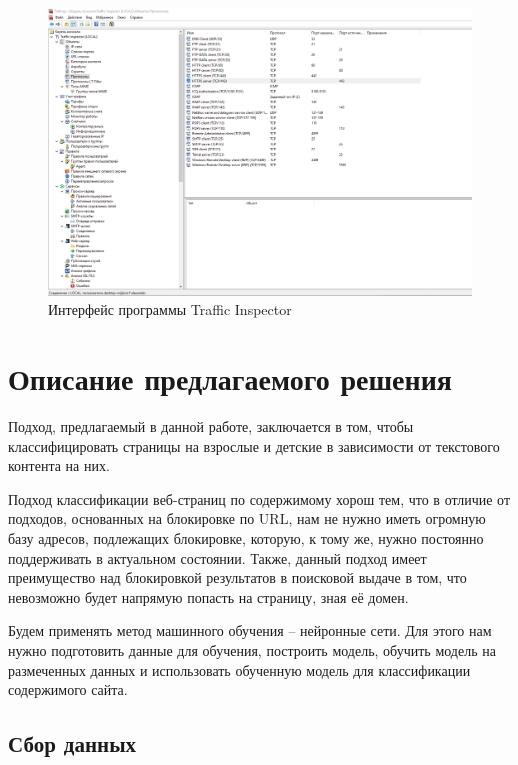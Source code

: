 \documentclass[14pt]{matmex-diploma}
\begin{document}
        \begin{figure}[h]
            \centering
        	\includegraphics[scale=0.4]{images/bad_interface.png}
        	\caption{Интерфейс программы Traffic Inspector}
        	\label{bad}
        \end{figure}    


\section{Описание предлагаемого решения}

    Подход, предлагаемый в данной работе, заключается в том, чтобы классифицировать страницы на взрослые и детские в зависимости
    от текстового контента на них.
    
    Подход классификации веб-страниц по содержимому хорош тем, что в отличие от подходов, основанных на блокировке по URL,
    нам не нужно иметь огромную базу адресов, подлежащих блокировке, которую, к тому же, нужно постоянно поддерживать в актуальном
    состоянии. Также, данный подход имеет преимущество над блокировкой результатов в поисковой выдаче в том, что невозможно будет 
    напрямую попасть на страницу, зная её домен.
    
    Будем применять метод машинного обучения – нейронные сети. Для этого нам нужно
    подготовить данные для обучения, построить модель, обучить модель на размеченных данных и использовать 
    обученную модель для классификации содержимого сайта.
    
    \subsection{Сбор данных} 
    
\end{document}
